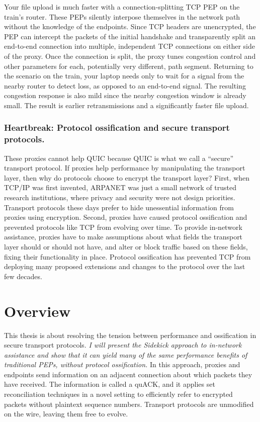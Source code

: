 Your file upload is much faster with a connection-splitting TCP PEP on the
train's router. These PEPs silently interpose themselves in the network path
without the knowledge of the endpoints. Since TCP headers are unencrypted, the
PEP can intercept the packets of the initial handshake and transparently split
an end-to-end connection into multiple, independent TCP connections on either
side of the proxy. Once the connection is split, the proxy tunes congestion
control and other parameters for each, potentially very different, path
segment. Returning to the scenario on the train, your laptop needs only to wait
for a signal from the nearby router to detect loss, as opposed to an end-to-end
signal. The resulting congestion response is also mild since the nearby
congestion window is already small. The result is earlier retransmissions and
a significantly faster file upload.

\subsubsection{Heartbreak: Protocol ossification and secure transport protocols.}

These proxies cannot help QUIC because QUIC is what we call a ``secure''
transport protocol.
If proxies help performance by manipulating the transport layer, then why do
protocols choose to encrypt the transport layer? First, when TCP/IP was first
invented, ARPANET was just a small network of trusted research institutions,
where privacy and security were not design priorities. Transport protocols
these days prefer to hide unessential information from proxies using
encryption. Second, proxies have caused protocol ossification and prevented
protocols like TCP from evolving over time. To provide in-network assistance,
proxies have to make assumptions about what fields the transport layer should
or should not have, and alter or block traffic based on these fields, fixing
their functionality in place. Protocol ossification has prevented TCP from
deploying many proposed extensions and changes to the protocol over the last
few decades.

\section{Overview}

This thesis is about resolving the tension between performance and ossification
in secure transport protocols. \textit{I will present the
Sidekick approach to in-network assistance and show that it can yield many of
the same performance benefits of traditional PEPs, without protocol
ossification.} In this approach, proxies and endpoints send information on an
adjacent connection about which packets they have received. The information is
called a quACK, and it applies set reconciliation techniques in a novel setting
to efficiently refer to encrypted packets without plaintext sequence numbers.
Transport protocols are unmodified on the wire, leaving them free to evolve.

